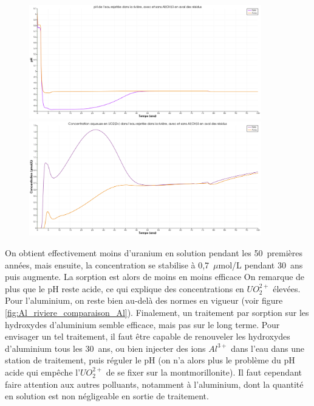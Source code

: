 \documentclass{article}
\begin{document}
\begin{figure}[H]
    \centering
    \begin{minipage}{0.5\textwidth}
        \centering
        \includegraphics[width=0.9\textwidth]{III_B_2_22.png} 
        \caption{}
        \label{fig:pH_riviere_comparaison_Al}
    \end{minipage}\hfill
    \begin{minipage}{0.5\textwidth}
        \centering
        \includegraphics[width=0.9\textwidth]{III_B_2_23.png} 
        \caption{}
        \label{fig:UO2_riviere_comparaison_Al}
    \end{minipage}
\end{figure}



On obtient effectivement moins d’uranium en solution pendant les 50~premières années, mais ensuite, la concentration se stabilise à 0,7~$\mu$mol/L pendant 30~ans puis augmente. La sorption est alors de moins en moins efficace On remarque de plus que le pH reste acide, ce qui explique des concentrations en $UO_2^{2+}$ élevées. Pour l’aluminium, on reste bien au-delà des normes en vigueur (voir figure \ref{fig:Al_riviere_comparaison_Al}).
Finalement, un traitement par sorption sur les hydroxydes d’aluminium semble efficace, mais pas sur le long terme. Pour envisager un tel traitement, il faut être capable de renouveler les hydroxydes d’aluminium tous les 30~ans, ou bien injecter des ions $Al^{3+}$ dans l’eau dans une station de traitement, puis réguler le pH (on n’a alors plus le problème du pH acide qui empêche l’$UO_2^{2+}$ de se fixer sur la montmorillonite). Il faut cependant faire attention aux autres polluants, notamment à l’aluminium, dont la quantité en solution est non négligeable en sortie de traitement.
\end{document}
